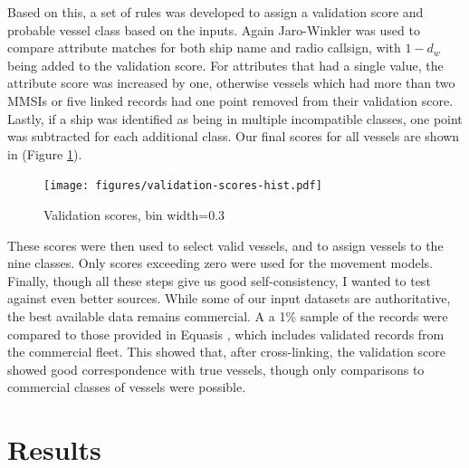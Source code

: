 \documentclass[12pt,letterpaper]{article}
\begin{document}
Based on this, a set of rules was developed to assign a validation score and probable vessel class based on the inputs.  Again Jaro-Winkler was used to compare attribute matches for both ship name and radio callsign, with $1 - d_w$ being added to the validation score. For attributes that had a single value, the attribute score was increased by one, otherwise vessels which had more than two MMSIs or five linked records had one point removed from their validation score. Lastly, if a ship was identified as being in multiple incompatible classes, one point was subtracted for each additional class. Our final scores for all vessels are shown in (Figure \ref{fig:validation-score-hist}).

\begin{figure}[h!]
  \centering
    \texttt{[image: figures/validation-scores-hist.pdf]}
  \caption {Validation scores, bin width=0.3}
  \label{fig:validation-score-hist}
\end{figure}

These scores were then used to select valid vessels, and to assign vessels to the nine classes. Only scores exceeding zero were used for the movement models. Finally, though all these steps give us good self-consistency, I wanted to test against even better sources.  %
While some of our input datasets are authoritative, the best available data remains commercial. A a 1\% sample of the records were compared to those provided in Equasis \citep{Equasis2011}, which includes validated records from the commercial fleet. This showed that, after cross-linking, the validation score showed good correspondence with true vessels, though only comparisons to commercial classes of vessels were possible.


\section{\textbf{Results}}
\end{document}
